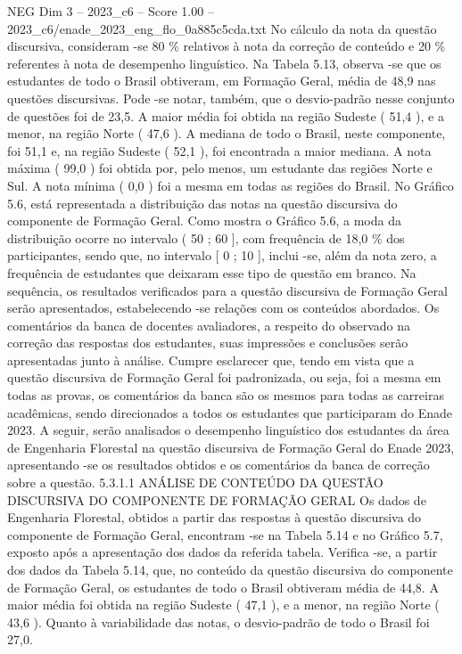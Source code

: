 \begin{textsample}{NEG Dim 3 – 2023\_c6 – Score 1.00 – 2023\_c6/enade\_2023\_eng\_flo\_0a885c5cda.txt}
No cálculo da nota da questão discursiva, consideram -se 80 \% relativos à nota da correção de conteúdo e 20 \% referentes à nota de desempenho linguístico.
Na Tabela 5.13, observa -se que os estudantes de todo o Brasil obtiveram, em Formação Geral, média de 48,9 nas questões discursivas.
Pode -se notar, também, que o desvio-padrão nesse conjunto de questões foi de 23,5.
A maior média foi obtida na região Sudeste ( 51,4 ), e a menor, na região Norte ( 47,6 ).
A mediana de todo o Brasil, neste componente, foi 51,1 e, na região Sudeste ( 52,1 ), foi encontrada a maior mediana.
A nota máxima ( 99,0 ) foi obtida por, pelo menos, um estudante das regiões Norte e Sul.
A nota mínima ( 0,0 ) foi a mesma em todas as regiões do Brasil.
No Gráfico 5.6, está representada a distribuição das notas na questão discursiva do componente de Formação Geral.
Como mostra o Gráfico 5.6, a moda da distribuição ocorre no intervalo ( 50 ; 60 ], com frequência de 18,0 \% dos participantes, sendo que, no intervalo [ 0 ; 10 ], inclui -se, além da nota zero, a frequência de estudantes que deixaram esse tipo de questão em branco.
Na sequência, os resultados verificados para a questão discursiva de Formação Geral serão apresentados, estabelecendo -se relações com os conteúdos abordados.
Os comentários da banca de docentes avaliadores, a respeito do observado na correção das respostas dos estudantes, suas impressões e conclusões serão apresentadas junto à análise.
Cumpre esclarecer que, tendo em vista que a questão discursiva de Formação Geral foi padronizada, ou seja, foi a mesma em todas as provas, os comentários da banca são os mesmos para todas as carreiras acadêmicas, sendo direcionados a todos os estudantes que participaram do Enade 2023.
A seguir, serão analisados o desempenho linguístico dos estudantes da área de Engenharia Florestal na questão discursiva de Formação Geral do Enade 2023, apresentando -se os resultados obtidos e os comentários da banca de correção sobre a questão. 5.3.1.1 ANÁLISE DE CONTEÚDO DA QUESTÃO DISCURSIVA DO COMPONENTE DE FORMAÇÃO GERAL Os dados de Engenharia Florestal, obtidos a partir das respostas à questão discursiva do componente de Formação Geral, encontram -se na Tabela 5.14 e no Gráfico 5.7, exposto após a apresentação dos dados da referida tabela.
Verifica -se, a partir dos dados da Tabela 5.14, que, no conteúdo da questão discursiva do componente de Formação Geral, os estudantes de todo o Brasil obtiveram média de 44,8.
A maior média foi obtida na região Sudeste ( 47,1 ), e a menor, na região Norte ( 43,6 ).
Quanto à variabilidade das notas, o desvio-padrão de todo o Brasil foi 27,0.

\end{textsample}
